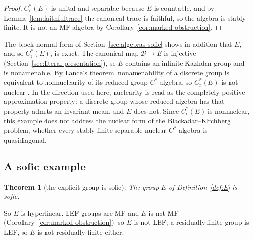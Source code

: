 \documentclass[11pt]{amsart}
\newcommand{\leanverified}[2]{\ignorespaces}
\theoremstyle{definition}
\theoremstyle{remark}
\theoremstyle{plain}
\newtheorem{mainthm}{Theorem}
\newcommand{\Cred}{C^*_{\mathrm r}}
\begin{document}
\begin{proof}
$\Cred(E)$ is unital and separable because $E$ is countable, and by
Lemma~\ref{lem:faithfultrace} the canonical trace is faithful, so the
algebra is stably finite.  It is not an MF algebra by
Corollary~\ref{cor:marked-obstruction}.
\end{proof}

The block normal form of Section~\ref{sec:algebras-sofic} shows in
addition that $E$, and so $\Cred(E)$, is exact.
The canonical map $\mathcal B\to E$ is injective
(Section~\ref{sec:literal-presentation}), so $E$ contains an infinite Kazhdan group
and is nonamenable.
\leanverified{Analysis/NuclearityAmenability}{GroupApproximation.NuclearityAmenability.manuscriptNotAmenableOfBaseEmbeds}
By Lance's theorem, nonamenability of a discrete group is equivalent
to nonnuclearity of its reduced group $C^*$-algebra, so
$\Cred(E)$ is not nuclear \cite{Lance}.  In the direction used here,
nuclearity is read as the completely positive approximation property:
a discrete group whose reduced algebra has that property admits an
invariant mean, and $E$ does not.
\leanverified{Analysis/LanceNuclearity}{GroupApproximation.CStarExactness.reducedGroupCStar_not_nuclear}
Since $\Cred(E)$ is nonnuclear, this example does not address the
nuclear form of the Blackadar--Kirchberg problem, whether every stably
finite separable nuclear $C^*$-algebra is quasidiagonal.

\subsection*{A sofic example}

\begin{mainthm}[the explicit group is sofic]\label{thm:Esofic}
The group $E$ of Definition~\ref{def:E} is sofic.
\leanverified{Sofic/LiteralSoficAssembly}{GroupApproximation.LiteralSoficAssembly.markedGroup_isSofic}
\end{mainthm}

\noindent
So $E$ is hyperlinear.  LEF groups are MF \cite{CDE} and $E$ is not
MF (Corollary~\ref{cor:marked-obstruction}), so $E$ is not LEF; a residually finite group
is LEF, so $E$ is not residually finite either.
\leanverified{Sofic/LiteralSoficConsequences}{GroupApproximation.LiteralSoficAssembly.markedGroup_finitelyPresented_hyperlinear_nonMF}
\leanverified{Sofic/LiteralSoficConsequences}{GroupApproximation.LiteralSoficAssembly.markedGroup_sofic_not_isLEF_unconditional}
\leanverified{Sofic/LiteralSoficConsequences}{GroupApproximation.LiteralSoficAssembly.markedGroup_finitelyPresented_sofic_nonMF}
\end{document}
